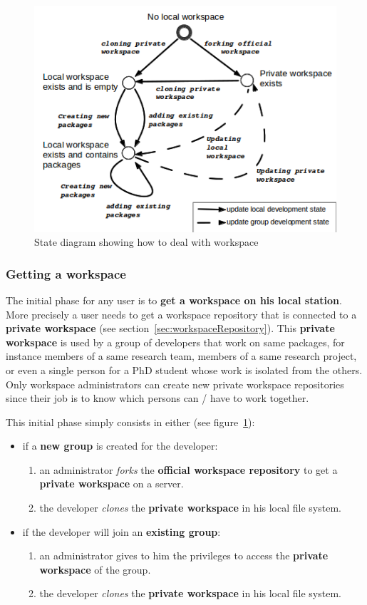 \documentclass[12pt,a4paper]{article}
\begin{document}
\begin{figure}
\center
\includegraphics[scale=1]{images/installWorkspace.png}
\caption{State diagram showing how to deal with workspace}
\label{fig:install_workspace}
\end{figure}


\subsubsection{Getting a workspace}

The initial phase for any user is to \textbf{get a workspace on his local station}. More precisely a user needs to get a workspace repository that is connected to a \textbf{private workspace} (see section~\ref{sec:workspaceRepository}). This \textbf{private workspace} is used by a group of developers that work on same packages, for instance members of a same research team, members of a same research project, or even a single person for a PhD student whose work is isolated from the others. Only workspace administrators can create new private workspace repositories since their job is to know which persons can / have to work together.

This initial phase simply consists in either (see figure~\ref{fig:install_workspace}):
\begin{itemize}
\item if a \textbf{new group} is created for the developer:
\begin{enumerate}
\item  an administrator \textit{forks} the \textbf{official workspace repository} to get a \textbf{private workspace} on a server.
\item the developer \textit{clones} the \textbf{private workspace} in his local file system.
\end{enumerate}
\item if the developer will join an \textbf{existing group}:
\begin{enumerate}
\item  an administrator gives to him the privileges to access the \textbf{private workspace} of the group.
\item the developer \textit{clones} the \textbf{private workspace} in his local file system.
\end{enumerate}
\end{itemize}
\end{document}
